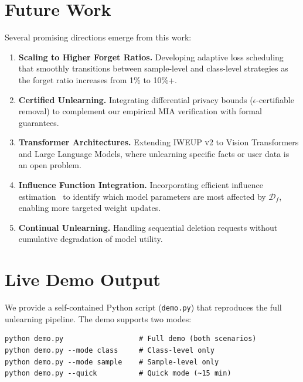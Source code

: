 \documentclass[11pt]{article}
\newcommand{\method}{\textsc{IWEUP v2}}
\begin{document}
\section{Future Work}
\label{sec:future}

Several promising directions emerge from this work:

\begin{enumerate}[leftmargin=*]
    \item \textbf{Scaling to Higher Forget Ratios.} Developing adaptive loss scheduling that smoothly transitions between sample-level and class-level strategies as the forget ratio increases from 1\% to 10\%+.
    \item \textbf{Certified Unlearning.} Integrating differential privacy bounds ($\epsilon$-certifiable removal) to complement our empirical MIA verification with formal guarantees.
    \item \textbf{Transformer Architectures.} Extending \method{} to Vision Transformers and Large Language Models, where unlearning specific facts or user data is an open problem.
    \item \textbf{Influence Function Integration.} Incorporating efficient influence estimation~\citep{koh2017understanding} to identify which model parameters are most affected by $\mathcal{D}_f$, enabling more targeted weight updates.
    \item \textbf{Continual Unlearning.} Handling sequential deletion requests without cumulative degradation of model utility.
\end{enumerate}




\appendix
\section{Live Demo Output}
\label{app:demo}

We provide a self-contained Python script (\texttt{demo.py}) that reproduces the full unlearning pipeline. The demo supports two modes:

\begin{verbatim}
python demo.py                  # Full demo (both scenarios)
python demo.py --mode class     # Class-level only
python demo.py --mode sample    # Sample-level only
python demo.py --quick          # Quick mode (~15 min)
\end{verbatim}
\end{document}

